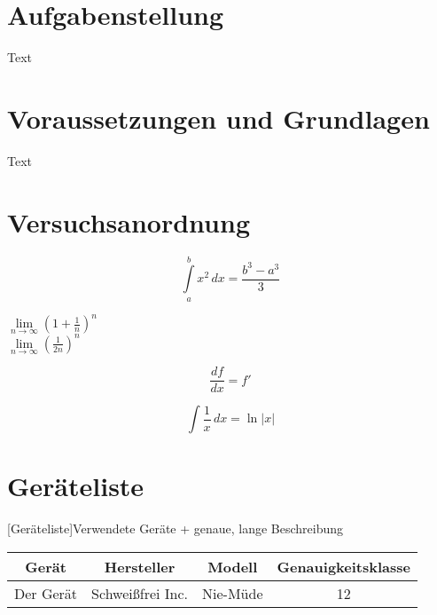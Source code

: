\documentclass[11pt]{scrartcl}
\begin{document}


\tableofcontents
\newpage

\section{Aufgabenstellung}
\label{sec:aufgabenstellung}

Text


\section{Voraussetzungen und Grundlagen}
\label{sec:voraussetzungen-rundlagen}

Text


\section{Versuchsanordnung}
\label{sec:versuchsanordnung}

\begin{equation}
\label{eq:grenzen-oben-unten}
    \int \limits_{a}^{b} x^2 \, dx =\frac{b^3-a^3}{3}  %
\end{equation}

\( \lim \limits_{n \to \infty} (1 + \frac{1}{n})^{n} \)  \\ %
$\lim \limits_{n \to \infty} (\frac{1}{2n})^n$  %

\begin{displaymath}
    \frac{df}{dx} = f'
\end{displaymath}

\[ \int \frac{1}{x} \, dx = \ln|x| \]  %



\section{Geräteliste}
\label{sec:geraeteliste}

\begin{center}
[Geräteliste]{Verwendete Geräte + genaue, lange Beschreibung}  %
\label{tab:geraeteliste}
    \begin{tabular}{|c|c|c|c|} \hline
        Gerät & Hersteller & Modell & Genauigkeitsklasse \\ \hline
        Der Gerät & Schweißfrei Inc. & Nie-Müde & 12 \\ \hline
    \end{tabular}
\end{center}
\end{document}
